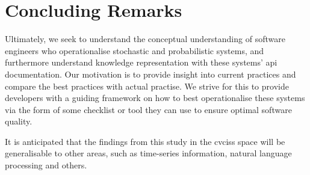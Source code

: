 \section{Concluding Remarks}

Ultimately, we seek to understand the conceptual understanding of software engineers who operationalise stochastic and probabilistic systems, and furthermore understand knowledge representation with these systems' \gls{api} documentation. Our motivation is to provide insight into current practices and compare the best practices with actual practise. We strive for this to  provide developers with a guiding framework on how to best operationalise these systems via the form of some checklist or tool they can use to ensure optimal software quality.

It is anticipated that the findings from this study in the \glspl{cvcis} space will be generalisable to other areas, such as time-series information, natural language processing and others.

